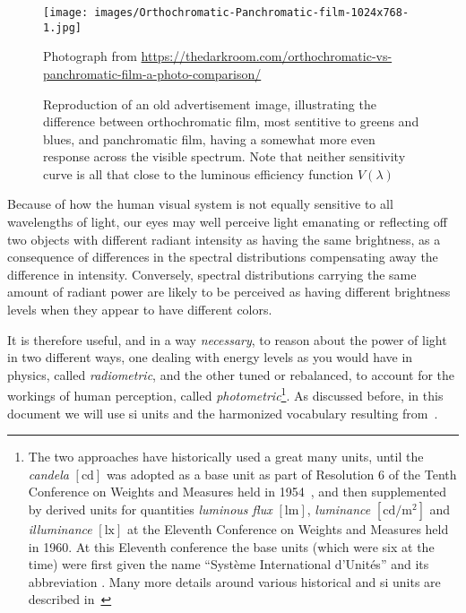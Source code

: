 \begin{figure}
	{
		\hfill
		\texttt{[image: images/Orthochromatic-Panchromatic-film-1024x768-1.jpg]}
		\hfill
	}	
	
	\caption{\label{fig:orthopanphoto}
		Reproduction of an old advertisement image, illustrating the difference between
		orthochromatic film, most sentitive to greens and blues, and panchromatic film,
		having a somewhat more even response across the visible spectrum. 
		Note that neither sensitivity curve is all that close to the luminous efficiency
		function $V(\lambda)$}
	{\scriptsize\hfill
		Photograph from \url{https://thedarkroom.com/orthochromatic-vs-panchromatic-film-a-photo-comparison/}
	}
\end{figure}

Because of how the human visual system is not equally sensitive to all wavelengths
of light, our eyes may well perceive light emanating or reflecting 
off two objects with different radiant intensity as having the same brightness, 
as a consequence of differences in the spectral distributions compensating 
away the difference in intensity. 
Conversely, \glspl{spectral distribution} carrying the same amount
of radiant power are likely to be perceived as having different brightness levels 
when they appear to have different colors.

It is therefore useful, and in a way \emph{necessary}, to reason about the power 
of light in two different ways, one dealing with energy levels as you would have in 
physics, called \textsl{radiometric}, and the other tuned or rebalanced, to account 
for the workings of human perception, called \textsl{photometric}\footnote{ 
The two approaches have historically used a great many units, 
until the \textsl{\gls{candela}} $[\unit\candela]$ was adopted as a base unit 
as part of Resolution 6 of the Tenth Conference on Weights and Measures
held in 1954~\cite[p. 163]{bipm:si.2019}, and then supplemented by derived units for
quantities \textsl{\gls{luminous flux}} $[\unit\lumen]$, 
\textsl{\gls{luminance}} $[\unit{\candela\per\square\meter}]$ 
and \textsl{\gls{illuminance}} $[\unit\lux]$ at the Eleventh Conference on Weights 
and Measures held in 1960.  
At this Eleventh conference the base units (which were six at the time) were first
given the name ``Syst\`eme International d’Unit\'es” and its abbreviation .
Many more details around various historical and \gls{si} units are
described in~\cite{Meyer-Arendt:68}}. 
As discussed before, in this document we will use \gls{si} units and the harmonized 
vocabulary resulting from~\cite{iso:80000-7:2019,cie:s017.2020,iec:60050-845:2020}.


